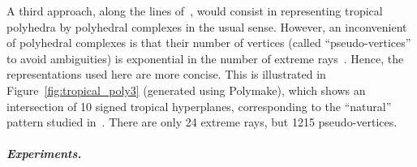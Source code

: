 \documentclass[proceedings]{stacs}
\begin{document}
A third approach, along the lines of~\cite{DS,joswig-2008}, would consist
in representing tropical polyhedra by polyhedral complexes in the usual sense.
However, an inconvenient of polyhedral complexes is that their number
of vertices (called ``pseudo-vertices'' to avoid ambiguities) is exponential
in the number of extreme rays~\cite{DS}. Hence, the representations used here
are more concise. 
This is illustrated in Figure~\ref{fig:tropical_poly3} (generated
using {\sc Polymake}), which shows an intersection of 10 signed tropical hyperplanes, corresponding
to the ``natural'' pattern studied in~\cite{AGK09}. There are only 24 extreme rays, but 1215 pseudo-vertices. 


\paragraph{\textit{Experiments.}}
\end{document}

